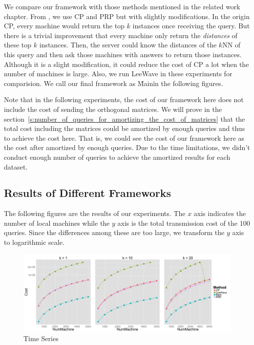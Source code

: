 We compare our framework with those methods mentioned in the related work chapter.  From \cite{PRP}, we use CP and PRP but with slightly modifications. In the origin CP, every machine would return the top $k$ instances once receiving the query.  But there is a trivial improvement that every machine only return the \emph{distances} of these top $k$ instances.  Then, the server could know the distances of the $k$NN of this query and then ask those machines with answers to return those instances.  Although it is a slight modification, it could reduce the cost of CP a lot when the number of machines is large.  Also, we run LeeWave \cite{LeeWave} in these experiments for comparision.  We call our final framework as \"Main\" in the following figures.


Note that in the following experiments, the cost of our framework here does not include the cost of sending the orthogonal matrices.  We will prove in the section~\ref{s:number_of_queries_for_amortizing_the_cost_of_matrices} that the total cost including the matrices could be amortized by enough queries and thus to achieve the cost here.  That is, we could see the cost of our framework here as the cost after amortized by enough queries.  Due to the time limitations, we didn't conduct enough number of queries to achieve the amortized results for each dataset.



\subsection{Results of Different Frameworks} %
\label{sub:results_of_different_fra}

The following figures are the results of our experiments.  The $x$ axis indicates the number of local machines while the $y$ axis is the total transmission cost of the 100 queries.  Since the differences among these are too large, we transform the $y$ axis to logarithmic scale.  

\begin{figure}[htpb!]
  \centering
  \includegraphics[width=1.0\linewidth]{exp/out/time.png}
  \caption{Time Series}
  \label{fig:out_time}
\end{figure}

